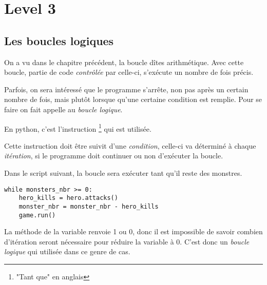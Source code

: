 
\chapter{Level 3}

\section{Les boucles logiques}

On a vu dans le chapitre précédent, la boucle dîtes arithmétique. Avec cette boucle, partie de code \emph{contrôlée} par celle-ci, s'exécute un nombre de fois précis.

Parfois, on sera intéressé que le programme s'arrête, non pas après un certain nombre de fois, mais plutôt lorsque qu'une certaine condition est remplie. Pour se faire on fait appelle au \emph{boucle logique}.

En python, c'est l'instruction \footnote{"Tant que" en anglais} qui est utilisée.

Cette instruction doit être suivit d'une \emph{condition}, celle-ci va déterminé à chaque \emph{itération}, si le programme doit continuer ou non d'exécuter la boucle.

Dans le script suivant, la boucle sera exécuter tant qu'il reste des monstres.

\begin{lstlisting}
while monsters_nbr >= 0:
	hero_kills = hero.attacks()
	monster_nbr = monster_nbr - hero_kills
	game.run()
\end{lstlisting}

La méthode  de la variable \codeintext{} renvoie 1 ou 0, donc il est impossible de savoir combien d'itération seront nécessaire pour réduire la variable  à 0.
C'est donc un \emph{boucle logique} qui utilisée dans ce genre de cas.

